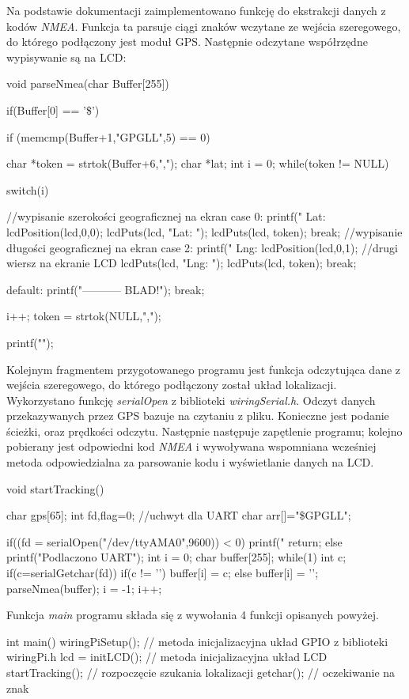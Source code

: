 \documentclass{article}
\begin{document}
		Na podstawie dokumentacji zaimplementowano funkcję do ekstrakcji danych z kodów \textit{NMEA}. Funkcja ta parsuje ciągi znaków wczytane ze wejścia szeregowego, do którego podłączony jest moduł GPS. Następnie odczytane współrzędne wypisywanie są na LCD:
		\begin{verbatimtab}[4]
	void parseNmea(char Buffer[255])
	{
		if(Buffer[0] == '\$')
		{
		if (memcmp(Buffer+1,"GPGLL",5) == 0)
		{
			char *token = strtok(Buffer+6,",");
			char *lat;
			int i = 0;
			while(token != NULL)
			{
				switch(i)
				{
				//wypisanie szerokości geograficznej na ekran
				case 0:
					printf(" Lat: %
					lcdPosition(lcd,0,0); 
					lcdPuts(lcd, "Lat: ");
					lcdPuts(lcd, token);
				    break;
				 //wypisanie długości geograficznej na ekran
				case 2:
					printf(" Lng: %
					lcdPosition(lcd,0,1); //drugi wiersz na ekranie LCD
					lcdPuts(lcd, "Lng: "); 
					lcdPuts(lcd, token);
					break;		
			
				default:
					printf("----------- BLAD!\n");
					break;
				}
				i++;
				token = strtok(NULL,",");
				}
			printf("\n");
			}
		}
	}
	\end{verbatimtab}
	
	Kolejnym fragmentem przygotowanego programu jest funkcja odczytująca dane z wejścia szeregowego, do którego podłączony został układ lokalizacji. Wykorzystano funkcję \textit{serialOpen} z biblioteki \textit{wiringSerial.h}. Odczyt danych przekazywanych przez GPS bazuje na czytaniu z pliku. Konieczne jest podanie ścieżki, oraz prędkości odczytu. Następnie następuje zapętlenie programu; kolejno pobierany jest odpowiedni kod \textit{NMEA} i wywoływana wspomniana wcześniej metoda odpowiedzialna za parsowanie kodu i wyświetlanie danych na LCD.
	\begin{verbatimtab}[4]
	void startTracking()
	{
		char gps[65];
		int fd,flag=0; //uchwyt dla UART
		char arr[]="\$GPGLL";

		if((fd = serialOpen("/dev/ttyAMA0",9600)) < 0)
		{
			printf("%
			return;
		} 
		else
		{
			printf("Podlaczono UART\n");
		}
		int i = 0;
		char buffer[255];
		while(1)
		{
		int c;
			if(c=serialGetchar(fd))
			{
				if(c != '\n')
				{
					buffer[i] = c;
				}
				else 
				{
					buffer[i] = '\0';
					parseNmea(buffer);
					i = -1;
				}
				i++;
			}
		}
	}
	\end{verbatimtab}
	
	Funkcja \textit{main} programu składa się z wywołania 4 funkcji opisanych powyżej.
	\begin{verbatimtab}
int main()
{
	wiringPiSetup(); // metoda inicjalizacyjna układ GPIO z biblioteki wiringPi.h  
	lcd = initLCD(); // metoda inicjalizacyjna układ LCD 
	startTracking(); // rozpoczęcie szukania lokalizacji
	getchar(); // oczekiwanie na znak 
}

	\end{verbatimtab}
	
\end{document}
